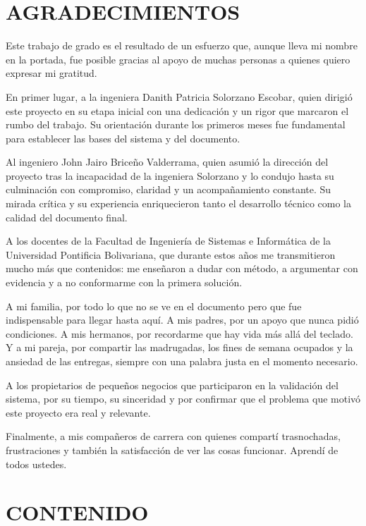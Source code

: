 \documentclass[spanish]{ieee_upb}
\begin{document}
\section*{AGRADECIMIENTOS}

Este trabajo de grado es el resultado de un esfuerzo que, aunque lleva mi nombre en la portada, fue posible gracias al apoyo de muchas personas a quienes quiero expresar mi gratitud.

En primer lugar, a la ingeniera Danith Patricia Solorzano Escobar, quien dirigió este proyecto en su etapa inicial con una dedicación y un rigor que marcaron el rumbo del trabajo. Su orientación durante los primeros meses fue fundamental para establecer las bases del sistema y del documento.

Al ingeniero John Jairo Briceño Valderrama, quien asumió la dirección del proyecto tras la incapacidad de la ingeniera Solorzano y lo condujo hasta su culminación con compromiso, claridad y un acompañamiento constante. Su mirada crítica y su experiencia enriquecieron tanto el desarrollo técnico como la calidad del documento final.

A los docentes de la Facultad de Ingeniería de Sistemas e Informática de la Universidad Pontificia Bolivariana, que durante estos años me transmitieron mucho más que contenidos: me enseñaron a dudar con método, a argumentar con evidencia y a no conformarme con la primera solución.

A mi familia, por todo lo que no se ve en el documento pero que fue indispensable para llegar hasta aquí. A mis padres, por un apoyo que nunca pidió condiciones. A mis hermanos, por recordarme que hay vida más allá del teclado. Y a mi pareja, por compartir las madrugadas, los fines de semana ocupados y la ansiedad de las entregas, siempre con una palabra justa en el momento necesario.

A los propietarios de pequeños negocios que participaron en la validación del sistema, por su tiempo, su sinceridad y por confirmar que el problema que motivó este proyecto era real y relevante.

Finalmente, a mis compañeros de carrera con quienes compartí trasnochadas, frustraciones y también la satisfacción de ver las cosas funcionar. Aprendí de todos ustedes.

\renewcommand{\contentsname}{}
\newpage
{}
\section*{CONTENIDO}
\tableofcontents
\end{document}
